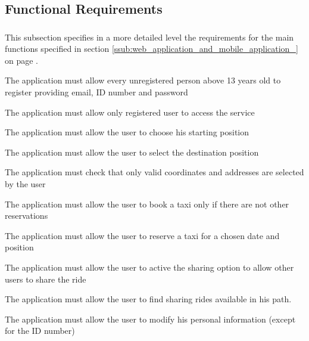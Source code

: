 
\subsection{Functional Requirements} %
\label{sec:functionalrequirement}
\subsubsection{}
This subsection specifies in a more detailed level the requirements for the main functions specified in section \ref{ssub:web_application_and_mobile_application_} on page \pageref{ssub:web_application_and_mobile_application_}.
\begin{enumerate}[label = \textbf{[FR\arabic*]}]
	\item The application must allow every unregistered person above 13 years old to register providing email, ID number and password
	\item The application must allow only registered user to access the service
	\item The application must allow the user to choose his starting position
	\item The application must allow the user to select the destination position
	\item The application must check that only valid coordinates and addresses  are selected by the user
	\item The application must allow the user to book a taxi only if there are not other reservations
	\item The application must allow the user to reserve a taxi for a chosen  date and position
	\item The application must allow the user to active the sharing option to allow other users to share the ride
	\item The application must allow the user to find sharing rides available in his path.
	\item The application must allow the user to modify his personal information (except for the ID number) 
\end{enumerate}


